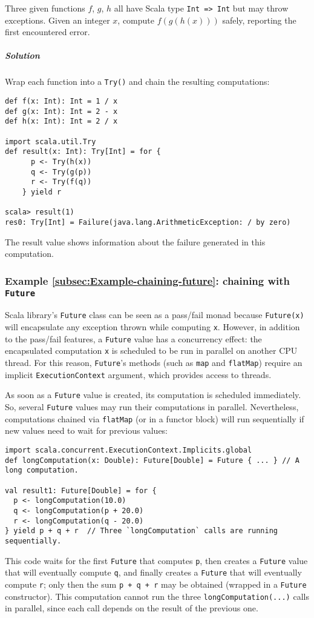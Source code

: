 Three given functions $f$, $g$, $h$ all have Scala type \lstinline!Int => Int!
but may throw exceptions. Given an integer $x$, compute $f(g(h(x)))$
safely, reporting the first encountered error.

\subparagraph{Solution}

Wrap each function into a \lstinline!Try()! and chain the resulting
computations:
\begin{lstlisting}
def f(x: Int): Int = 1 / x
def g(x: Int): Int = 2 - x
def h(x: Int): Int = 2 / x

import scala.util.Try
def result(x: Int): Try[Int] = for {
      p <- Try(h(x))
      q <- Try(g(p))
      r <- Try(f(q))
    } yield r

scala> result(1)
res0: Try[Int] = Failure(java.lang.ArithmeticException: / by zero)
\end{lstlisting}
The result value shows information about the failure generated in
this computation.

\subsubsection{Example \label{subsec:Example-chaining-future}\ref{subsec:Example-chaining-future}:
chaining with \texttt{Future}}

Scala library\textsf{'}s \lstinline!Future! class can be seen as a pass/fail
monad because \lstinline!Future(x)! will encapsulate any exception
thrown while computing \lstinline!x!. However, in addition to the
pass/fail features, a \lstinline!Future! value has a concurrency
effect: the encapsulated computation \lstinline!x! is scheduled to
be run in parallel on another CPU thread. For this reason, \lstinline!Future!\textsf{'}s
methods (such as \lstinline!map! and \lstinline!flatMap!) require
an implicit \lstinline!ExecutionContext! argument, which provides
access to threads.

As soon as a \lstinline!Future! value is created, its computation
is scheduled immediately. So, several \lstinline!Future! values may
run their computations in parallel. Nevertheless, computations chained
via \lstinline!flatMap! (or in a functor block) will run sequentially
if new values need to wait for previous values:
\begin{lstlisting}
import scala.concurrent.ExecutionContext.Implicits.global
def longComputation(x: Double): Future[Double] = Future { ... } // A long computation.

val result1: Future[Double] = for {
  p <- longComputation(10.0)
  q <- longComputation(p + 20.0)
  r <- longComputation(q - 20.0)
} yield p + q + r  // Three `longComputation` calls are running sequentially.
\end{lstlisting}
This code waits for the first \lstinline!Future! that computes \lstinline!p!,
then creates a \lstinline!Future! value that will eventually compute
\lstinline!q!, and finally creates a \lstinline!Future! that will
eventually compute \lstinline!r!; only then the sum \lstinline!p + q + r!
may be obtained (wrapped in a \lstinline!Future! constructor). This
computation cannot run the three \lstinline!longComputation(...)!
calls in parallel, since each call depends on the result of the previous
one.

